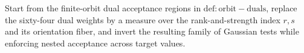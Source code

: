Start from the finite-orbit dual acceptance regions in \(\mathrm{def:orbit-duals}\), replace the sixty-four dual weights by a measure over the rank-and-strength index \(r,s\) and its orientation fiber, and invert the resulting family of Gaussian tests while enforcing nested acceptance across target values.